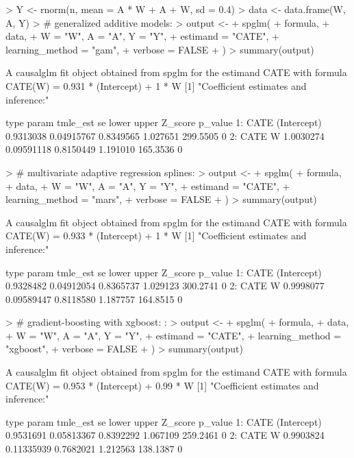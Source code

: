 \documentclass{article}
\begin{document}
\begin{Schunk}
\begin{Sinput}
> Y <- rnorm(n, mean = A * W + A + W, sd = 0.4)
> data <- data.frame(W, A, Y)
> # generalized additive models:
> output <-
+   spglm(
+     formula,
+     data,
+     W = "W", A = "A", Y = "Y",
+     estimand = "CATE",
+     learning_method = "gam",
+     verbose = FALSE
+   )
> summary(output)
\end{Sinput}
\begin{Soutput}
A causalglm fit object obtained from spglm for the estimand CATE with formula 
CATE(W) = 0.931 * (Intercept) + 1 * W
[1] "Coefficient estimates and inference:"

   type       param  tmle_est         se     lower    upper  Z_score p_value
1: CATE (Intercept) 0.9313038 0.04915767 0.8349565 1.027651 299.5505       0
2: CATE           W 1.0030274 0.09591118 0.8150449 1.191010 165.3536       0
\end{Soutput}
\begin{Sinput}
> # multivariate adaptive regression splines:
> output <-
+   spglm(
+     formula,
+     data,
+     W = "W", A = "A", Y = "Y",
+     estimand = "CATE",
+     learning_method = "mars",
+     verbose = FALSE
+   )
> summary(output)
\end{Sinput}
\begin{Soutput}
A causalglm fit object obtained from spglm for the estimand CATE with formula 
CATE(W) = 0.933 * (Intercept) + 1 * W
[1] "Coefficient estimates and inference:"

   type       param  tmle_est         se     lower    upper  Z_score p_value
1: CATE (Intercept) 0.9328482 0.04912054 0.8365737 1.029123 300.2741       0
2: CATE           W 0.9998077 0.09589447 0.8118580 1.187757 164.8515       0
\end{Soutput}
\begin{Sinput}
> # gradient-boosting with xgboost: :
> output <-
+   spglm(
+     formula,
+     data,
+     W = "W", A = "A", Y = "Y",
+     estimand = "CATE",
+     learning_method = "xgboost",
+     verbose = FALSE
+   )
> summary(output)
\end{Sinput}
\begin{Soutput}
A causalglm fit object obtained from spglm for the estimand CATE with formula 
CATE(W) = 0.953 * (Intercept) + 0.99 * W
[1] "Coefficient estimates and inference:"

   type       param  tmle_est         se     lower    upper  Z_score p_value
1: CATE (Intercept) 0.9531691 0.05813367 0.8392292 1.067109 259.2461       0
2: CATE           W 0.9903824 0.11335939 0.7682021 1.212563 138.1387       0
\end{Soutput}
\end{Schunk}
\end{document}

